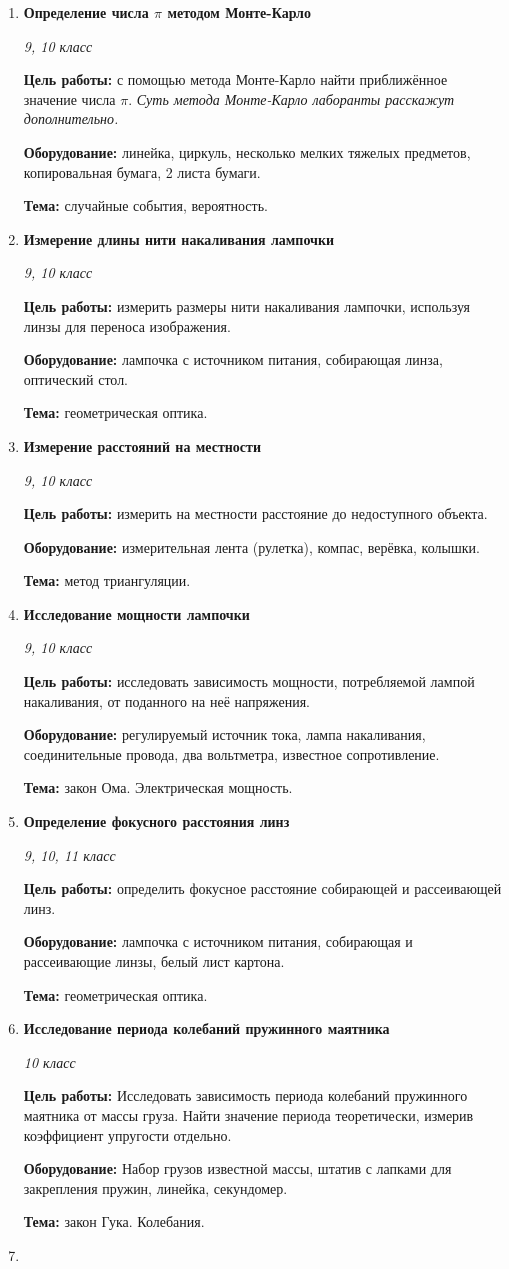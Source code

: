 \documentclass[a4paper,10pt]{article}
\newcommand{\labtitle}[5]{
	\textbf{#2}\par
	\textit{#1 класс}\par
	\textbf{Цель работы:} #3\par
	\textbf{Оборудование:} #4\par
	\textbf{Тема:} #5
}
\begin{document}
\begin{enumerate}
	\item \labtitle
		{9, 10}
		{Определение числа $\pi$ методом Монте-Карло}
		{с помощью метода Монте-Карло найти приближённое значение числа $\pi$. \textit{Суть метода Монте-Карло лаборанты расскажут дополнительно.}}
		{линейка, циркуль, несколько мелких тяжелых предметов, копировальная бумага, 2 листа бумаги.}
		{случайные события, вероятность.}
	\item \labtitle
		{9, 10}
		{Измерение длины нити накаливания лампочки}
		{измерить размеры нити накаливания лампочки, используя линзы для переноса изображения.}
		{лампочка с источником питания, собирающая линза, оптический стол.}
		{геометрическая оптика.}
	\item \labtitle
		{9, 10}
		{Измерение расстояний на местности}
		{измерить на местности расстояние до недоступного объекта.}
		{измерительная лента (рулетка), компас, верёвка, колышки.}
		{метод триангуляции.}
	\item \labtitle
		{9, 10}
		{Исследование мощности лампочки}
		{исследовать зависимость мощности, потребляемой лампой накаливания, от поданного на неё напряжения.}
		{регулируемый источник тока, лампа накаливания, соединительные провода, два вольтметра, известное сопротивление.}
		{закон Ома. Электрическая мощность.}
	\item \labtitle
		{9, 10, 11}
		{Определение фокусного расстояния линз}
		{определить фокусное расстояние собирающей и рассеивающей линз.}
		{лампочка с источником питания, собирающая и рассеивающие линзы, белый лист картона.}
		{геометрическая оптика.}
	\item \labtitle
		{10}
		{Исследование периода колебаний пружинного маятника}
		{Исследовать зависимость периода колебаний пружинного маятника от массы груза. Найти значение периода теоретически, измерив коэффициент упругости отдельно.}
		{Набор грузов известной массы, штатив с лапками для закрепления пружин, линейка, секундомер.}
		{закон Гука. Колебания.}
	\item \labtitle

\end{enumerate}
\end{document}

